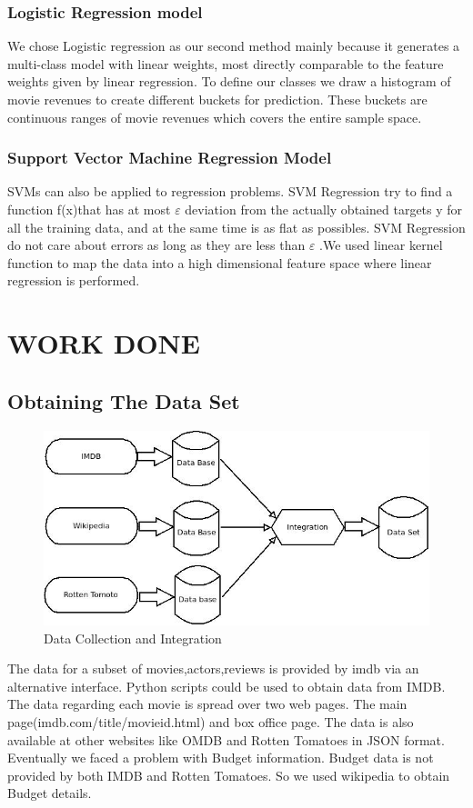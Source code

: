 \subsection{Logistic Regression model}
We chose Logistic regression as our second method mainly because it generates a multi-class model with linear weights, most directly comparable to the feature weights given by linear regression. To define our classes we draw a histogram of movie revenues to create different buckets for prediction. These buckets are continuous ranges of movie revenues which covers the entire sample space.
\subsection{Support Vector Machine Regression Model}
SVMs can also be applied to regression problems.
SVM Regression try to find a function f(x)that has at most $\varepsilon$  deviation from the actually obtained targets y for all the training data, and at the same time is as flat as possibles. SVM Regression do not care about errors as long as they are less than $\varepsilon$ .We used linear kernel function to  map the data into a high dimensional feature space where linear regression is performed.
\clearpage
\chapter{WORK DONE}

\section{Obtaining The Data Set}
\begin{figure}[htb!]
  \centering
      \includegraphics[scale=0.55]{data.jpeg}
  \caption{Data Collection and Integration}
\end{figure}
The data for a subset of movies,actors,reviews is provided by imdb via an alternative interface. Python scripts could be used to obtain data from IMDB. The data regarding each movie is spread over two web pages. The main page(imdb.com/title/movieid.html) and box office page.  
The data is also available at other websites like OMDB and Rotten Tomatoes in JSON format.
Eventually we faced a problem with Budget information.
Budget data is not provided by both IMDB and  Rotten Tomatoes. So we used wikipedia to obtain Budget details.
